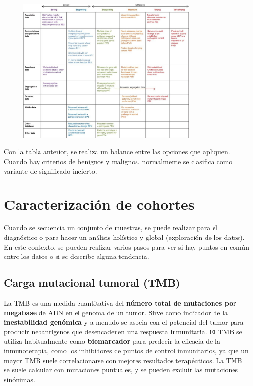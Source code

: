 \begin{figure}[htbp]
\centering
\includegraphics[width = 0.8\textwidth]{figs/acmg-guideline-table.jpg}
\end{figure}

Con la tabla anterior, se realiza un balance entre las opciones que apliquen. Cuando hay criterios de benignos y malignos, normalmente se clasifica como variante de significado incierto. 

\chapter{Caracterización de cohortes}
Cuando se secuencia un conjunto de muestras, se puede realizar para el diagnóstico o para hacer un análisis holístico y global (exploración de los datos). En este contexto, se pueden realizar varios pasos para ver si hay puntos en común entre los datos o si se describe alguna tendencia.

\section{Carga mutacional tumoral (TMB)}
La TMB es una medida cuantitativa del \textbf{número total de mutaciones por megabase} de ADN en el genoma de un tumor. Sirve como indicador de la \textbf{inestabilidad genómica} y a menudo se asocia con el potencial del tumor para producir neoantígenos que desencadenen una respuesta inmunitaria. El TMB se utiliza habitualmente como \textbf{biomarcador} para predecir la eficacia de la inmunoterapia, como los inhibidores de puntos de control inmunitarios, ya que un mayor TMB suele correlacionarse con mejores resultados terapéuticos. La TMB se suele calcular con mutaciones puntuales, y se pueden excluir las mutaciones sinónimas.

